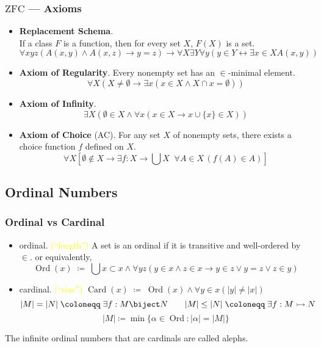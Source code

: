 \documentclass[UTF8,11pt,colorlinks,compress,openany]{beamer}%
\begin{document}
\begin{frame}\frametitle{$\mathrm{ZFC}$ --- Axioms}
	\begin{itemize}
		\item \textbf{Replacement Schema}.\\
		If a class $F$ is a function, then for every set $X$, $F(X)$ is a set.
		\[\forall xyz(A(x,y)\wedge A(x,z)\to y=z)\to\forall X\exists Y\forall y(y\in Y\leftrightarrow\exists x\in X A(x,y))\]
		\item \textbf{Axiom of Regularity}. Every nonempty set has an $\in$-minimal element.
		\[\forall X(X\neq\emptyset\to\exists x(x\in X\wedge X\cap x=\emptyset))\]
		\item \textbf{Axiom of Infinity}.
		\[\exists X(\emptyset\in X\wedge\forall x(x\in X\to x\cup\{x\}\in X))\]
		\item \textbf{Axiom of Choice} (AC). For any set $X$ of nonempty sets, there exists a choice function $f$ defined on $X$.
		\[\forall X\left[\emptyset\notin X\to\exists f: X\to\bigcup X\;\; \forall A\in X\,(f(A)\in A)\right]\]
	\end{itemize}
\end{frame}

\subsection{Ordinal Numbers}

\begin{frame}\frametitle{Ordinal vs Cardinal}
	\begin{itemize}
		\item ordinal. \textcolor{yellow}{(``length'')} A set is an ordinal if it is transitive and well-ordered by $\in$. or equivalently,
		\[\operatorname{Ord}(x)\;\coloneqq \;\bigcup x\subset x\wedge\forall yz(y\in x\wedge z\in x\to y\in z\vee y=z\vee z\in y)\]
		\item cardinal. \textcolor{yellow}{(``size'')}\quad
		$\operatorname{Card}(x)\;\coloneqq \;\operatorname{Ord}(x)\wedge\forall y\in x(|y|\neq|x|)$
		\[|M|=|N|\;\coloneqq \;\exists f: M\biject N\qquad |M|\leq|N|\;\coloneqq \;\exists f: M\rightarrowtail N\]
		\[|M|\coloneqq \min\{\alpha\in \operatorname{Ord}: |\alpha|=|M|\}\]
	\end{itemize}
	The infinite ordinal numbers that are cardinals are called alephs.
\end{frame}
\end{document}
